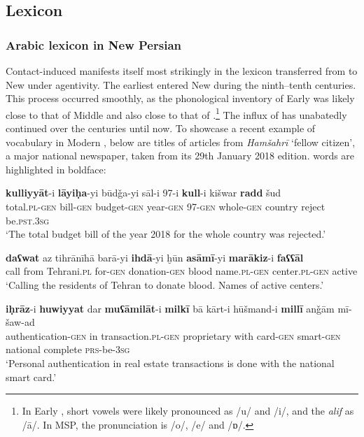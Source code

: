 \documentclass[output=paper]{langsci/langscibook}
\begin{document}
\subsection{Lexicon}

\subsubsection{Arabic lexicon in New Persian}

Contact-induced  manifests itself most strikingly in the lexicon transferred from  to New  under  agentivity. The earliest  entered New  during the ninth–tenth centuries. This process occurred smoothly, as the phonological inventory of Early   was likely close to that of Middle  and also close to that of  .\footnote{In Early  , short vowels were likely pronounced as /u/ and /i/, and the \textit{alif} as /ā/. In MSP, the pronunciation is /o/, /e/ and /ɒ/.} The influx of   has unabatedly continued over the centuries until now. To showcase a recent example of  vocabulary in Modern , below are titles of articles from \textit{Hamšahrī} ‘fellow citizen’, a major  national newspaper, taken from its 29th January 2018 edition.  words are highlighted in boldface:

\ea
\ea
\gll \textbf{kulliyyāt}-i \textbf{lāyiḥa}-yi būdǧa-yi sāl-i 97-i \textbf{kull}-i kišwar \textbf{radd} šud\\
total.\textsc{pl-gen} bill-\textsc{gen} budget-\textsc{gen} year-\textsc{gen} 97-\textsc{gen} whole-\textsc{gen} country reject be.\textsc{pst.3sg}\\
    \glt ‘The total budget bill of the year 2018 for the whole country was rejected.’

\ex
\gll \textbf{daʕwat} {az} {tihrānīhā} barā-yi \textbf{ihdā}-yi ḫūn \textbf{asāmī}-yi \textbf{marākiz}-i \textbf{faʕʕāl}\\
call from Tehrani.\textsc{pl} for-\textsc{gen} donation-\textsc{gen} blood name.\textsc{pl-gen} center.\textsc{pl-gen} active\\
    \glt ‘Calling the residents of Tehran to donate blood. Names of active centers.’

\ex
\gll \textbf{iḥrāz}-i \textbf{huwiyyat} dar \textbf{muʕāmilāt}-i \textbf{milkī} {bā} {kārt-i} hūšmand-i \textbf{millī} {anǧām} {mī-šaw-ad}\\
authentication-\textsc{gen}  in transaction.\textsc{pl-gen} proprietary with card-\textsc{gen} smart-\textsc{gen} national complete \textsc{prs}-be-\textsc{3sg}\\
    \glt‘Personal authentication in real estate transactions is done with the national smart card.’
\z
\z
\end{document}
